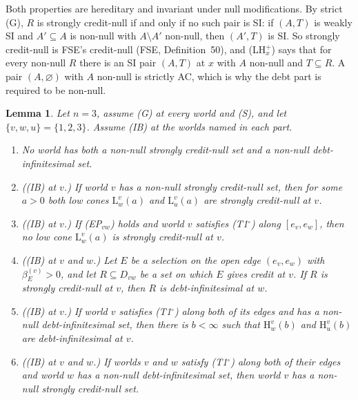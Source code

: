 \documentclass[11pt]{article}
\newtheorem{lemma}[theorem]{Lemma}
\theoremstyle{definition}\newtheorem{definition}[theorem]{Definition}
\theoremstyle{remark}\newtheorem{remark}[theorem]{Remark}
\newcommand{\Lo}[3]{\mathrm L^{#1}_{#2}(#3)}
\newcommand{\Hi}[3]{\mathrm H^{#1}_{#2}(#3)}
\newcommand{\To}{\textup{(T1$^\circ$)}}
\begin{document}
Both properties are hereditary and invariant under null modifications. By
strict (G), $R$ is strongly credit-null if and only if no such pair is SI:
if $(A,T)$ is weakly SI and $A'\subseteq A$ is non-null with $A\setminus A'$
non-null, then $(A',T)$ is SI. So strongly credit-null is FSE's credit-null
(FSE, Definition~50), and (LH$^+_x$) says that for every non-null $R$ there
is an SI pair $(A,T)$ at $x$ with $A$ non-null and $T\subseteq R$. A pair
$(A,\varnothing)$ with $A$ non-null is strictly AC, which is why the debt
part is required to be non-null.

\begin{lemma}\label{lem:sCN}
Let $n=3$, assume (G) at every world and (S), and let $\{v,w,u\}=
\{1,2,3\}$. Assume (IB) at the worlds named in each part.
\begin{enumerate}[label=(\alph*),leftmargin=*,itemsep=2pt]
\item No world has both a non-null strongly credit-null set and a non-null
debt-infinitesimal set.
\item ((IB) at $v$.) If world $v$ has a non-null strongly credit-null set,
then for some $a>0$ both low cones $\Lo vwa$ and $\Lo vua$ are strongly
credit-null at $v$.
\item ((IB) at $v$.) If (EP$_{vw}$) holds and world $v$ satisfies \To{}
along $[e_v,e_w]$, then no low cone $\Lo vwa$ is strongly credit-null at
$v$.
\item ((IB) at $v$ and $w$.) Let $E$ be a selection on the open edge
$(e_v,e_w)$ with $\beta^{(v)}_E>0$, and let $R\subseteq D_{vw}$ be a set on
which $E$ gives credit at $v$. If $R$ is strongly credit-null at $v$, then
$R$ is debt-infinitesimal at $w$.
\item ((IB) at $v$.) If world $v$ satisfies \To{} along both of its edges
and has a non-null debt-infinitesimal set, then there is $b<\infty$ such
that $\Hi vwb$ and $\Hi vub$ are debt-infinitesimal at $v$.
\item ((IB) at $v$ and $w$.) If worlds $v$ and $w$ satisfy \To{} along both
of their edges and world $w$ has a non-null debt-infinitesimal set, then
world $v$ has a non-null strongly credit-null set.
\end{enumerate}
\end{lemma}
\end{document}

